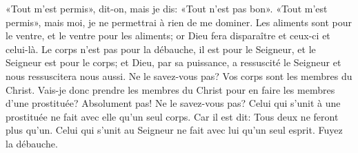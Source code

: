 «Tout m’est permis», dit-on,
	mais je dis: «Tout n’est pas bon».
«Tout m’est permis», mais moi, je ne permettrai à rien de me dominer.
Les aliments sont pour le ventre, et le ventre pour les aliments;
	or Dieu fera disparaître et ceux-ci et celui-là.
Le corps n’est pas pour la débauche, il est pour le Seigneur,
	et le Seigneur est pour le corps;
	et Dieu, par sa puissance, a ressuscité le Seigneur
		et nous ressuscitera nous aussi.
Ne le savez-vous pas?
	Vos corps sont les membres du Christ.
Vais-je donc prendre les membres du Christ
	pour en faire les membres d’une prostituée?
	Absolument pas!
Ne le savez-vous pas?
	Celui qui s’unit à une prostituée ne fait avec elle qu’un seul corps.
	Car il est dit: Tous deux ne feront plus qu’un.
Celui qui s’unit au Seigneur ne fait avec lui qu’un seul esprit.
	Fuyez la débauche.
